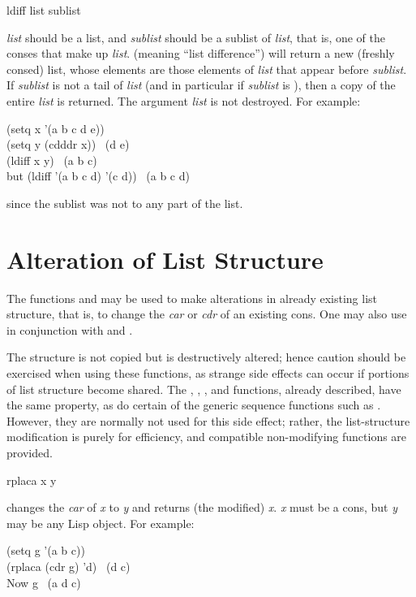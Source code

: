 \begin{defun}[Function]
ldiff list sublist

\emph{list} should be a list, and \emph{sublist} should be a sublist
of \emph{list}, that is, one of the conses that make up \emph{list}.
 (meaning ``list difference'') will return a new (freshly consed)
list, whose elements are those elements of \emph{list} that appear before
\emph{sublist}.  If \emph{sublist} is not a tail of \emph{list}
(and in particular if \emph{sublist} is {\nil}),
then a copy of the entire \emph{list} is returned.
The argument \emph{list} is not destroyed.
For example:
\begin{lisp}
(setq x '(a b c d e)) \\
(setq y (cdddr x)) \EV\ (d e) \\
(ldiff x y) \EV\ (a b c) \\[4pt]
\textrm{but} (ldiff '(a b c d) '(c d)) \EV\ (a b c d)
\end{lisp}
since the sublist was not  to any part of the list.
\end{defun}

\section{Alteration of List Structure}

The functions  and 
may be used to make alterations in already existing
list structure, that is, to change the \emph{car} or \emph{cdr} of an
existing cons.
One may also use  in conjunction with  and .

The structure is not copied but is destructively altered;
hence caution should be exercised when using these functions, as
strange side effects can occur if portions of list structure become
shared.
The , , ,
and  functions, already
described,
have the same property, as do certain of the generic sequence
functions such as .
However, they are normally not
used for this side effect; rather, the list-structure modification
is purely for efficiency, and compatible non-modifying functions
are provided.

\begin{defun}[Function]
rplaca x y

 changes the \emph{car} of \emph{x} to \emph{y} and returns
(the modified) \emph{x}.  \emph{x} must be a cons, but \emph{y} may be any
Lisp object.
For example:
\begin{lisp}
(setq g '(a b c)) \\
(rplaca (cdr g) 'd) \EV\ (d c) \\
\textrm{Now} g \EV\ (a d c)
\end{lisp}
\end{defun}

